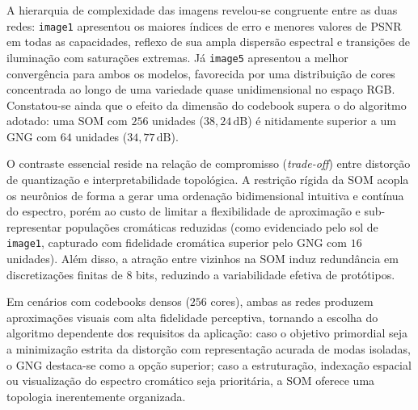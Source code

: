 \documentclass[11pt,a4paper]{article}
\begin{document}
A hierarquia de complexidade das imagens revelou-se congruente entre as duas redes: \texttt{image1} apresentou os maiores índices de erro e menores valores de PSNR em todas as capacidades, reflexo de sua ampla dispersão espectral e transições de iluminação com saturações extremas. Já \texttt{image5} apresentou a melhor convergência para ambos os modelos, favorecida por uma distribuição de cores concentrada ao longo de uma variedade quase unidimensional no espaço RGB. Constatou-se ainda que o efeito da dimensão do codebook supera o do algoritmo adotado: uma SOM com $256$ unidades ($38{,}24\,\mathrm{dB}$) é nitidamente superior a um GNG com $64$ unidades ($34{,}77\,\mathrm{dB}$).

O contraste essencial reside na relação de compromisso (\textit{trade-off}) entre distorção de quantização e interpretabilidade topológica. A restrição rígida da SOM acopla os neurônios de forma a gerar uma ordenação bidimensional intuitiva e contínua do espectro, porém ao custo de limitar a flexibilidade de aproximação e sub-representar populações cromáticas reduzidas (como evidenciado pelo sol de \texttt{image1}, capturado com fidelidade cromática superior pelo GNG com $16$ unidades). Além disso, a atração entre vizinhos na SOM induz redundância em discretizações finitas de $8$ bits, reduzindo a variabilidade efetiva de protótipos.

Em cenários com codebooks densos ($256$ cores), ambas as redes produzem aproximações visuais com alta fidelidade perceptiva, tornando a escolha do algoritmo dependente dos requisitos da aplicação: caso o objetivo primordial seja a minimização estrita da distorção com representação acurada de modas isoladas, o GNG destaca-se como a opção superior; caso a estruturação, indexação espacial ou visualização do espectro cromático seja prioritária, a SOM oferece uma topologia inerentemente organizada.
\end{document}
